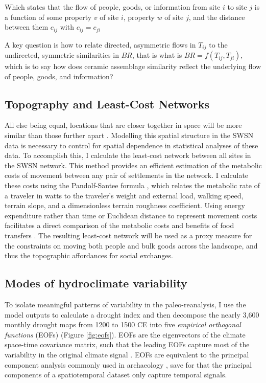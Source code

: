 \documentclass[fleqn,10pt]{wlscirep}
\begin{document}
Which states that the flow of people, goods, or information from site $i$ to site $j$ is a function of some property $v$ of site $i$, property $w$ of site $j$, and the distance between them $c_{ij}$ with $c_{ij} = c_{ji}$

A key question is how to relate directed, asymmetric flows in $T_{ij}$ to the undirected, symmetric similarities in $BR$, that is what is $BR = f(T_{ij},T_{ji})$, which is to say how does ceramic assemblage similarity reflect the underlying flow of people, goods, and information?

\subsection*{Topography and Least-Cost Networks}
All else being equal, locations that are closer together in space will be more similar than those further apart \cite{Tobler1970}. Modelling this spatial structure in the SWSN data is necessary to control for spatial dependence in statistical analyses of these data. To accomplish this, I calculate the least-cost network between all sites in the SWSN network. This method provides an efficient estimation of the metabolic costs of movement between any pair of settlements in the network. I calculate these costs using the Pandolf-Santee formula \cite{White2012}, which relates the metabolic rate of a traveler in watts to the traveler's weight and external load, walking speed, terrain slope, and a dimensionless terrain roughness coefficient. Using energy expenditure rather than time or Euclidean distance to represent movement costs facilitates a direct comparison of the metabolic costs and benefits of food transfers  \cite{Drennan1984}. The resulting least-cost network will be used as a proxy measure for the constraints on moving both people and bulk goods across the landscape, and thus the topographic affordances for social exchanges.

\subsection*{Modes of hydroclimate variability}
To isolate meaningful patterns of variability in the paleo-reanalysis, I use the model outputs to calculate a drought index and then decompose the nearly 3,600 monthly drought maps from 1200 to 1500 CE into five \textit{empirical orthogonal functions} (EOFs) (Figure \ref{fig:eofs}). EOFs are the eigenvectors of the climate space-time covariance matrix, such that the leading EOFs capture most of the variability in the original climate signal \cite{Lorenz1956EmpiricalPrediction}. EOFs are equivalent to the principal component analysis commonly used in archaeology \cite[e.g.]{Dean1996DemographyStress}, save for that the principal components of a spatiotemporal dataset only capture temporal signals.
\end{document}
